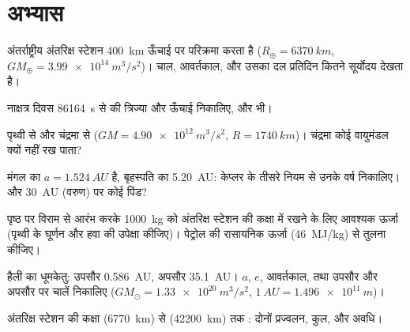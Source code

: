 \section{अभ्यास}

\begin{exercise}[$\star$]\label{exo:b1:central-forces:1}
अंतर्राष्ट्रीय अंतरिक्ष स्टेशन \qty{400}{km} ऊँचाई पर परिक्रमा करता है
($R_\oplus = \qty{6370}{km}$, $GM_\oplus = \qty{3.99e14}{m^3/s^2}$)। चाल,
आवर्तकाल, और उसका दल प्रतिदिन कितने सूर्योदय देखता है।
\end{exercise}

\begin{exercise}[$\star$]\label{exo:b1:central-forces:2}
नाक्षत्र दिवस \qty{86164}{s} से  की त्रिज्या और ऊँचाई
निकालिए, और  भी।
\end{exercise}

\begin{exercise}[$\star$]\label{exo:b1:central-forces:3}
पृथ्वी से और चंद्रमा से  ($GM = \qty{4.90e12}{m^3/s^2}$,
$R = \qty{1740}{km}$)। चंद्रमा कोई वायुमंडल क्यों नहीं रख पाता?
\end{exercise}

\begin{exercise}[$\star$]\label{exo:b1:central-forces:4}
मंगल का $a = \qty{1.524}{AU}$ है, बृहस्पति का \qty{5.20}{AU}: केप्लर के
तीसरे नियम से उनके वर्ष निकालिए। और \qty{30}{AU} (वरुण) पर कोई पिंड?
\end{exercise}

\begin{exercise}[$\star\star$]\label{exo:b1:central-forces:5}
पृष्ठ पर विराम से आरंभ करके \qty{1000}{kg} को अंतरिक्ष स्टेशन की कक्षा में
रखने के लिए आवश्यक ऊर्जा (पृथ्वी के घूर्णन और हवा की उपेक्षा कीजिए)।
पेट्रोल की रासायनिक ऊर्जा (\qty{46}{MJ/kg}) से तुलना कीजिए।
\end{exercise}

\begin{exercise}[$\star\star$]\label{exo:b1:central-forces:6}
हैली का धूमकेतु: उपसौर \qty{0.586}{AU}, अपसौर \qty{35.1}{AU}।
$a$, $e$, आवर्तकाल, तथा उपसौर और अपसौर पर चालें निकालिए
($GM_\odot = \qty{1.33e20}{m^3/s^2}$, $\qty{1}{AU} = \qty{1.496e11}{m}$)।
\end{exercise}

\begin{exercise}[$\star\star$]\label{exo:b1:central-forces:7}
अंतरिक्ष स्टेशन की कक्षा (\qty{6770}{km}) से 
(\qty{42200}{km}) तक : दोनों प्रज्वलन, कुल, और अवधि।
\end{exercise}

